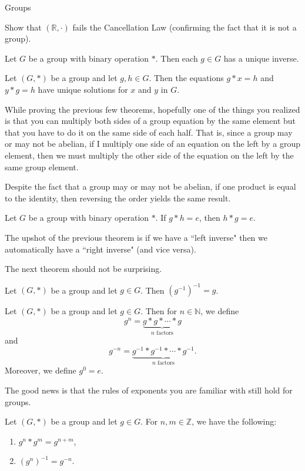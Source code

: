 \begin{section}{Groups}
\begin{exercise}
Show that $(\mathbb{R},\cdot)$ fails the Cancellation Law (confirming the fact that it is not a group).
\end{exercise}

\begin{corollary}
Let $G$ be a group with binary operation $*$.  Then each $g\in G$ has a unique inverse.
\end{corollary}

\begin{theorem}\label{thm:unique_soln}
Let $(G,*)$ be a group and let $g,h\in G$.  Then the equations $g*x=h$ and $y*g=h$ have unique solutions for $x$ and $y$ in $G$.  
\end{theorem}

While proving the previous few theorems, hopefully one of the things you realized is that you can multiply both sides of a group equation by the same element but that you have to do it on the same side of each half.  That is, since a group may or may not be abelian, if I multiply one side of an equation on the left by a group element, then we must multiply the other side of the equation on the left by the same group element.

Despite the fact that a group may or may not be abelian, if one product is equal to the identity, then reversing the order yields the same result.

\begin{theorem}
Let $G$ be a group with binary operation $*$.  If $g*h=e$, then $h*g=e$.
\end{theorem}

The upshot of the previous theorem is if we have a ``left inverse" then we automatically have a ``right inverse" (and vice versa).

The next theorem should not be surprising.

\begin{theorem}
Let $(G,*)$ be a group and let $g\in G$.  Then $(g^{-1})^{-1}=g$.
\end{theorem}

\begin{definition}
Let $(G,*)$ be a group and let $g\in G$.  Then for $n\in \mathbb{N}$, we define
\[
g^n=\underbrace{g*g*\cdots *g}_{n\text{ factors}}
\]
and
\[
g^{-n}=\underbrace{g^{-1}*g^{-1}*\cdots *g^{-1}}_{n\text{ factors}}.
\]
Moreover, we define $g^0=e$.
\end{definition}

The good news is that the rules of exponents you are familiar with still hold for groups.

\begin{theorem}
Let $(G,*)$ be a group and let $g\in G$.  For $n,m\in\mathbb{Z}$, we have the following:
\begin{enumerate}[label=\rm{(\alph*)}]
\item $g^n*g^m=g^{n+m}$,
\item $(g^n)^{-1}=g^{-n}$.
\end{enumerate}
\end{theorem}

\end{section}

